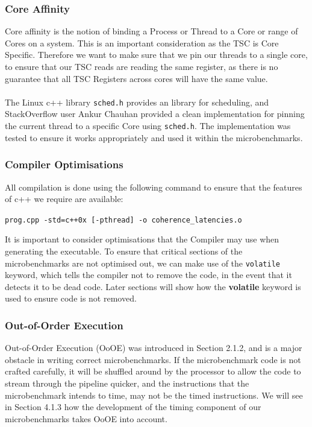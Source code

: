 \documentclass[bsc,frontabs,twoside,singlespacing,parskip,deptreport]{infthesis}     %
\begin{document}
\subsubsection{Core Affinity}
Core affinity is the notion of binding a Process or Thread to a Core or range of Cores on a system. This is an important consideration as the TSC is Core Specific. Therefore we want to make sure that we pin our threads to a single core, to ensure that our TSC reads are reading the same register, as there is no guarantee that all TSC Registers across cores will have the same value. \\
\\
The Linux c++ library \texttt{sched.h} provides an library for scheduling, and StackOverflow user Ankur Chauhan provided a clean implementation\cite{corepin_src} for pinning the current thread to a specific Core using \texttt{sched.h}. The implementation was tested to ensure it works appropriately and used it within the microbenchmarks.

\subsubsection{Compiler Optimisations}\label{compiler-optimisations}

All compilation is done using the following command to ensure that the features of c++ we require are available:
\begin{center}
    \texttt{prog.cpp -std=c++0x [-pthread] -o coherence\_latencies.o}
\end{center}
It is important to consider optimisations that the Compiler may use when generating the executable. To ensure that critical sections of the microbenchmarks are not optimised out, we can make use of the \texttt{volatile} keyword, which tells the compiler not to remove the code, in the event that it detects it to be dead code. Later sections will show how the \textbf{volatile} keyword is used to ensure code is not removed.

\subsubsection{Out-of-Order Execution}
Out-of-Order Execution (OoOE) was introduced in Section 2.1.2, and is a major obstacle in writing correct microbenchmarks. If the microbenchmark code is not crafted carefully, it will be shuffled around by the processor to allow the code to stream through the pipeline quicker, and the instructions that the microbenchmark intends to time, may not be the timed instructions. We will see in Section 4.1.3 how the development of the timing component of our microbenchmarks takes OoOE into account.
\end{document}
